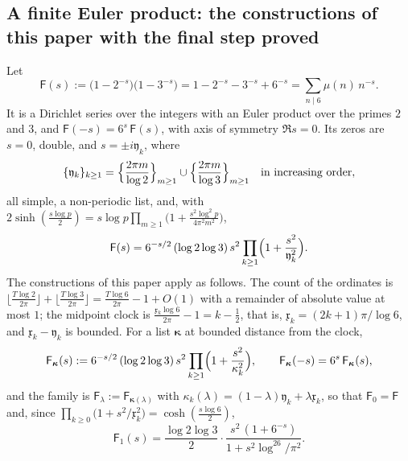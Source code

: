 \documentclass[11pt,reqno]{amsart}
\numberwithin{equation}{section}
\theoremstyle{plain}
\theoremstyle{definition}
\theoremstyle{remark}
\begin{document}
\subsection{A finite Euler product: the constructions of this paper with the final step proved}
\label{subsec:finite-euler-model}

Let
\begin{equation}\label{eq:finite-euler}
 \mathsf F(s):=\bigl(1-2^{-s}\bigr)\bigl(1-3^{-s}\bigr)=1-2^{-s}-3^{-s}+6^{-s}=\sum_{n\mid6}\mu(n)\,n^{-s}.
\end{equation}
It is a Dirichlet series over the integers with an Euler product over the primes $2$ and $3$, and $\mathsf F(-s)=6^{s}\,\mathsf F(s)$, with axis of symmetry $\Re s=0$.  Its zeros are $s=0$, double, and $s=\pm i\mathfrak y_k$, where
\begin{equation}\label{eq:finite-euler-zeros}
 \{\mathfrak y_k\}_{k\ge1}=\Bigl\{\frac{2\pi m}{\log2}\Bigr\}_{m\ge1}\cup\Bigl\{\frac{2\pi m}{\log3}\Bigr\}_{m\ge1}\quad\text{in increasing order},
\end{equation}
all simple, a non-periodic list, and, with $2\sinh(\frac{s\log p}2)=s\log p\prod_{m\ge1}\bigl(1+\frac{s^2\log^2p}{4\pi^2m^2}\bigr)$,
\begin{equation}\label{eq:finite-euler-hadamard}
 \mathsf F(s)=6^{-s/2}\,(\log2\log3)\,s^{2}\prod_{k\ge1}\Bigl(1+\frac{s^2}{\mathfrak y_k^2}\Bigr).
\end{equation}
The constructions of this paper apply as follows.  The count of the ordinates is $\lfloor\frac{T\log2}{2\pi}\rfloor+\lfloor\frac{T\log3}{2\pi}\rfloor=\frac{T\log6}{2\pi}-1+O(1)$ with a remainder of absolute value at most $1$; the midpoint clock is $\frac{\mathfrak x_k\log6}{2\pi}-1=k-\frac12$, that is, $\mathfrak x_k=(2k+1)\pi/\log6$, and $\mathfrak x_k-\mathfrak y_k$ is bounded.  For a list $\boldsymbol{\kappa}$ at bounded distance from the clock,
\begin{equation}\label{eq:finite-euler-list}
 \mathsf F_{\boldsymbol{\kappa}}(s):=6^{-s/2}\,(\log2\log3)\,s^{2}\prod_{k\ge1}\Bigl(1+\frac{s^2}{\kappa_k^2}\Bigr),\qquad\mathsf F_{\boldsymbol{\kappa}}(-s)=6^{s}\,\mathsf F_{\boldsymbol{\kappa}}(s),
\end{equation}
and the family is $\mathsf F_\lambda:=\mathsf F_{\boldsymbol{\kappa}(\lambda)}$ with $\kappa_k(\lambda)=(1-\lambda)\mathfrak y_k+\lambda\mathfrak x_k$, so that $\mathsf F_0=\mathsf F$ and, since $\prod_{k\ge0}\bigl(1+s^2/\mathfrak x_k^2\bigr)=\cosh(\frac{s\log6}2)$,
\begin{equation}\label{eq:finite-euler-clock}
 \mathsf F_1(s)=\frac{\log2\log3}2\cdot\frac{s^{2}\,(1+6^{-s})}{1+s^2\log^26/\pi^2}.
\end{equation}
\end{document}
